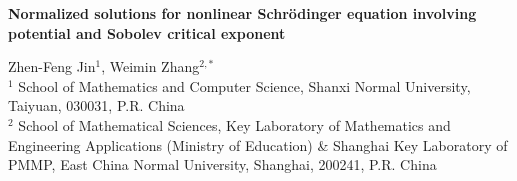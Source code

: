 \documentclass[10pt]{article}
\numberwithin{equation}{section}
\numberwithin{equation}{section}
\begin{document}
\begin{center}
\textbf{Normalized solutions for nonlinear
Schr\"{o}dinger equation involving potential and Sobolev critical exponent}\\
\end{center}

\begin{center}
 Zhen-Feng Jin$^{1}$, Weimin Zhang$^{2, *}$\\

$^{1}$ School of Mathematics and Computer Science, Shanxi Normal University,\\ Taiyuan, 030031, P.R. China\\
$^{2}$ School of Mathematical Sciences,  Key Laboratory of Mathematics and Engineering Applications (Ministry of Education) \& Shanghai Key Laboratory of PMMP,  East China Normal University, Shanghai, 200241, P.R. China
\end{center}
\end{document}
